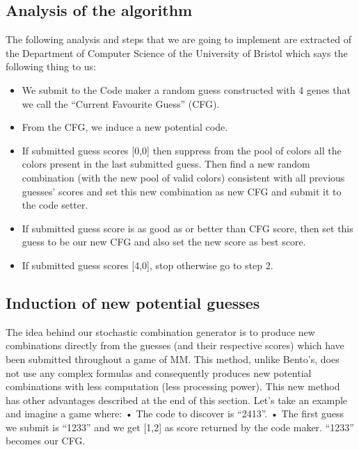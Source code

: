 \documentclass[12pt,letterpaper]{article}
\begin{document}
\subsection{Analysis of the algorithm}
\begin{raggedleft}
The following analysis and steps that we are going to implement are extracted of the Department of Computer Science of the University of Bristol which says the following thing to us:
\end{raggedleft}
\begin{itemize}
\item  We  submit  to  the  Code  maker  a  random  guess constructed with 4 genes that we call the “Current Favourite Guess” (CFG).
\item  From the CFG, we induce a new potential code.
\item  If submitted guess scores [0,0] then suppress from the pool of colors all the colors present in the last submitted guess. Then find  a new random combination  (with  the  new  pool  of  valid  colors) consistent with all previous guesses’ scores and set this new combination as new CFG and submit it to the code setter.
\newpage
\item If submitted guess score is as good as or better than CFG score, then set this guess to be our new CFG and also set the new score as best score.
\item If submitted guess scores [4,0], stop otherwise go to step 2.
\end {itemize}

\subsection{Induction of new potential guesses}
\begin{raggedleft}
The idea behind our stochastic combination generator
is  to  produce  new  combinations  directly  from  the
guesses (and their respective scores) which have been
submitted throughout a game of MM. This method,
unlike Bento’s, does not use any complex formulas
and     consequently     produces     new     potential
combinations with less computation (less processing
power).  This  new  method  has  other  advantages
described at the end of this section.   Let’s take an
example and imagine a game where:\newline\newline
•  The code to discover is “2413”.\newline\newline
• The first guess we submit is “1233” and we get
[1,2] as score returned by the code maker. “1233”
becomes  our  CFG. \newline
\end{raggedleft}
\end{document}

